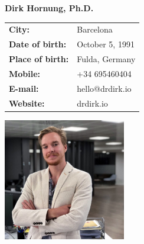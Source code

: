 \documentclass[11pt]{article}
\begin{document}
\Large
\noindent
\textbf{Dirk Hornung, Ph.D.} \\

\normalsize
\noindent
\begin{minipage}{0.5\linewidth}
  \begin{tabularx}{0.6\textwidth}{>{\bfseries}l l}
    City:           & Barcelona \\
    Date of birth:  & October 5, 1991\\
    Place of birth: & Fulda, Germany \\
    Mobile:         & +34 695460404 \\
    E-mail:         & hello@drdirk.io \\
    Website:      	& drdirk.io
  \end{tabularx}
\end{minipage}
\begin{minipage}{0.5\linewidth}
  \begin{flushright}
    \includegraphics[width=0.4\textwidth]{dirk.png}
  \end{flushright}
\end{minipage}


\end{document}
